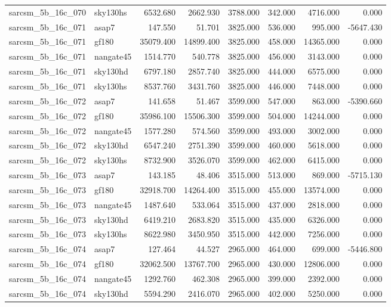 \begin{tabular}{llrrrrrr}
sarcsm\_5b\_16c\_070 & sky130hs & 6532.680 & 2662.930 & 3788.000 & 342.000 & 4716.000 & 0.000 \\
sarcsm\_5b\_16c\_071 & asap7 & 147.550 & 51.701 & 3825.000 & 536.000 & 995.000 & -5647.430 \\
sarcsm\_5b\_16c\_071 & gf180 & 35079.400 & 14899.400 & 3825.000 & 458.000 & 14365.000 & 0.000 \\
sarcsm\_5b\_16c\_071 & nangate45 & 1514.770 & 540.778 & 3825.000 & 456.000 & 3143.000 & 0.000 \\
sarcsm\_5b\_16c\_071 & sky130hd & 6797.180 & 2857.740 & 3825.000 & 444.000 & 6575.000 & 0.000 \\
sarcsm\_5b\_16c\_071 & sky130hs & 8537.760 & 3431.760 & 3825.000 & 446.000 & 7448.000 & 0.000 \\
sarcsm\_5b\_16c\_072 & asap7 & 141.658 & 51.467 & 3599.000 & 547.000 & 863.000 & -5390.660 \\
sarcsm\_5b\_16c\_072 & gf180 & 35986.100 & 15506.300 & 3599.000 & 504.000 & 14244.000 & 0.000 \\
sarcsm\_5b\_16c\_072 & nangate45 & 1577.280 & 574.560 & 3599.000 & 493.000 & 3002.000 & 0.000 \\
sarcsm\_5b\_16c\_072 & sky130hd & 6547.240 & 2751.390 & 3599.000 & 460.000 & 5618.000 & 0.000 \\
sarcsm\_5b\_16c\_072 & sky130hs & 8732.900 & 3526.070 & 3599.000 & 462.000 & 6415.000 & 0.000 \\
sarcsm\_5b\_16c\_073 & asap7 & 143.185 & 48.406 & 3515.000 & 513.000 & 869.000 & -5715.130 \\
sarcsm\_5b\_16c\_073 & gf180 & 32918.700 & 14264.400 & 3515.000 & 455.000 & 13574.000 & 0.000 \\
sarcsm\_5b\_16c\_073 & nangate45 & 1487.640 & 533.064 & 3515.000 & 437.000 & 2818.000 & 0.000 \\
sarcsm\_5b\_16c\_073 & sky130hd & 6419.210 & 2683.820 & 3515.000 & 435.000 & 6326.000 & 0.000 \\
sarcsm\_5b\_16c\_073 & sky130hs & 8622.980 & 3450.950 & 3515.000 & 442.000 & 7256.000 & 0.000 \\
sarcsm\_5b\_16c\_074 & asap7 & 127.464 & 44.527 & 2965.000 & 464.000 & 699.000 & -5446.800 \\
sarcsm\_5b\_16c\_074 & gf180 & 32062.500 & 13767.700 & 2965.000 & 430.000 & 12806.000 & 0.000 \\
sarcsm\_5b\_16c\_074 & nangate45 & 1292.760 & 462.308 & 2965.000 & 399.000 & 2392.000 & 0.000 \\
sarcsm\_5b\_16c\_074 & sky130hd & 5594.290 & 2416.070 & 2965.000 & 402.000 & 5250.000 & 0.000 \\

\end{tabular}
